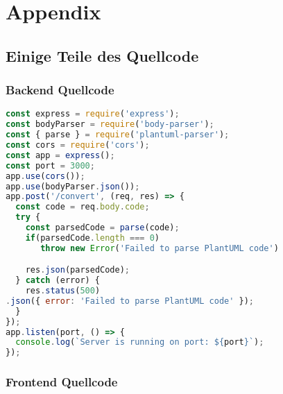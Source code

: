 
\chapter{Appendix}
\section{Einige Teile des Quellcode}
\subsection{Backend Quellcode}

\begin{lstlisting}[caption={Node/Express Backend Quelltext}, label={lst:bakcend}, language=javascript]
const express = require('express');
const bodyParser = require('body-parser');
const { parse } = require('plantuml-parser');
const cors = require('cors');
const app = express();
const port = 3000;
app.use(cors());
app.use(bodyParser.json());
app.post('/convert', (req, res) => {
  const code = req.body.code;
  try {
    const parsedCode = parse(code);
    if(parsedCode.length === 0)
       throw new Error('Failed to parse PlantUML code')

    res.json(parsedCode);
  } catch (error) {
    res.status(500)
.json({ error: 'Failed to parse PlantUML code' });
  }
});
app.listen(port, () => {
  console.log(`Server is running on port: ${port}`);
});
\end{lstlisting}


\subsection{Frontend Quellcode}

